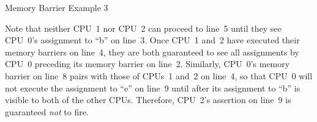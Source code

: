 \begin{listing*}
\scriptsize
{}
\caption{Memory Barrier Example 3}
\label{lst:app:whymb:Memory Barrier Example 3}
\end{listing*}


Note that neither CPU~1 nor CPU~2 can proceed to line~5 until they see
CPU~0's assignment to ``b'' on line~3.
Once CPU~1 and~2 have executed their memory barriers on line~4, they
are both guaranteed to see all assignments by CPU~0 preceding its memory
barrier on line~2.
Similarly, CPU~0's memory barrier on line~8 pairs with those of CPUs~1 and~2
on line~4, so that CPU~0 will not execute the assignment to ``e'' on
line~9 until after its assignment to ``b'' is visible to both of the
other CPUs.
Therefore, CPU~2's assertion on line~9 is guaranteed \emph{not} to fire.

